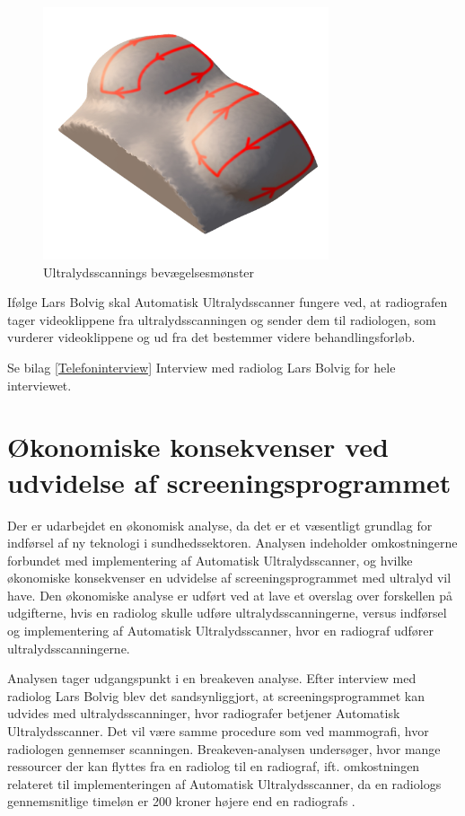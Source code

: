 \begin{figure}[H]
    \centering
    \includegraphics[width=0.75\textwidth]{figurer/d/probebevagelse}
    \caption{Ultralydsscannings bevægelsesmønster}
    \label{Probensbevagelse}
\end{figure}

Ifølge Lars Bolvig skal Automatisk Ultralydsscanner fungere ved, at radiografen tager videoklippene fra ultralydsscanningen og sender dem til radiologen, som vurderer videoklippene og ud fra det bestemmer videre behandlingsforløb.

Se bilag \ref{Telefoninterview} Interview med radiolog Lars Bolvig for hele interviewet. 

\section{Økonomiske konsekvenser ved udvidelse af screeningsprogrammet} 
Der er udarbejdet en økonomisk analyse, da det er et væsentligt grundlag for indførsel af ny teknologi i sundhedssektoren. Analysen indeholder omkostningerne forbundet med implementering af Automatisk Ultralydsscanner, og hvilke økonomiske konsekvenser en udvidelse af screeningsprogrammet med ultralyd vil have. Den økonomiske analyse er udført ved at lave et overslag over forskellen på udgifterne, hvis en radiolog skulle udføre ultralydsscanningerne, versus indførsel og implementering af Automatisk Ultralydsscanner, hvor en radiograf udfører ultralydsscanningerne. 

Analysen tager udgangspunkt i en breakeven analyse.  Efter interview med radiolog Lars Bolvig blev det sandsynliggjort, at screeningsprogrammet kan udvides med ultralydsscanninger, hvor radiografer betjener Automatisk Ultralydsscanner. Det vil være samme procedure som ved mammografi, hvor radiologen gennemser scanningen. Breakeven-analysen undersøger, hvor mange ressourcer der kan flyttes fra en radiolog til en radiograf, ift. omkostningen relateret til implementeringen af Automatisk Ultralydsscanner, da en radiologs gennemsnitlige timeløn er 200 kroner højere end en radiografs \cite{Lon}.

